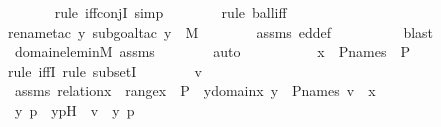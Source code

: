 \begin{isabellebody}
\ \ \ \ \ \ \isamarkupfalse%
{\isacharparenleft}{\kern0pt}rule\ iff{\isacharunderscore}{\kern0pt}conjI{\isacharcomma}{\kern0pt}\ simp{\isacharparenright}{\kern0pt}{\isacharplus}{\kern0pt}\ \isanewline
\ \ \ \ \ \ \isamarkupfalse%
{\isacharparenleft}{\kern0pt}rule\ ball{\isacharunderscore}{\kern0pt}iff{\isacharparenright}{\kern0pt}\isanewline
\ \ \ \ \ \ \isamarkupfalse%
{\isacharparenleft}{\kern0pt}rename{\isacharunderscore}{\kern0pt}tac\ y{\isacharcomma}{\kern0pt}\ subgoal{\isacharunderscore}{\kern0pt}tac\ {\isachardoublequoteopen}y\ {\isasymin}\ M{\isachardoublequoteclose}{\isacharparenright}{\kern0pt}\isanewline
\ \ \ \ \ \ \isamarkupfalse%
\ assms{}\ ed{\isacharunderscore}{\kern0pt}def\ \isanewline
\ \ \ \ \ \ \ \isamarkupfalse%
\ blast\isanewline
\ \ \ \ \ \ \isamarkupfalse%
\ domain{\isacharunderscore}{\kern0pt}elem{\isacharunderscore}{\kern0pt}in{\isacharunderscore}{\kern0pt}M\ assms{}\isanewline
\ \ \ \ \ \ \isamarkupfalse%
\ auto\ \isanewline
\ \ \ \ \isamarkupfalse%
\ \isamarkupfalse%
\ {\isachardoublequoteopen}{\isachardot}{\kern0pt}{\isachardot}{\kern0pt}{\isachardot}{\kern0pt}\ {\isasymlongleftrightarrow}\ x\ {\isasymsubseteq}\ P{\isacharunderscore}{\kern0pt}names\ {\isasymtimes}\ P{\isachardoublequoteclose}\ \isanewline
\ \ \ \ \isamarkupfalse%
{\isacharparenleft}{\kern0pt}rule\ iffI{\isacharcomma}{\kern0pt}\ rule\ subsetI{\isacharparenright}{\kern0pt}\isanewline
\ \ \ \ \ \ \isamarkupfalse%
\ v\ \isamarkupfalse%
\ assms{}{\isacharcolon}{\kern0pt}\ {\isachardoublequoteopen}relation{\isacharparenleft}{\kern0pt}x{\isacharparenright}{\kern0pt}\ {\isasymand}\ range{\isacharparenleft}{\kern0pt}x{\isacharparenright}{\kern0pt}\ {\isasymsubseteq}\ P\ {\isasymand}\ {\isacharparenleft}{\kern0pt}{\isasymforall}y{\isasymin}domain{\isacharparenleft}{\kern0pt}x{\isacharparenright}{\kern0pt}{\isachardot}{\kern0pt}\ y\ {\isasymin}\ P{\isacharunderscore}{\kern0pt}names{\isacharparenright}{\kern0pt}{\isachardoublequoteclose}\ {\isachardoublequoteopen}v\ {\isasymin}\ x{\isachardoublequoteclose}\ \isanewline
\ \ \ \ \ \ \isamarkupfalse%
\ \isamarkupfalse%
\ y\ p\ \ ypH\ {\isacharcolon}{\kern0pt}\ {\isachardoublequoteopen}v\ {\isacharequal}{\kern0pt}\ {\isacharless}{\kern0pt}y{\isacharcomma}{\kern0pt}\ p{\isachargreater}{\kern0pt}{\isachardoublequoteclose}\ \isamarkupfalse%

\end{isabellebody}
